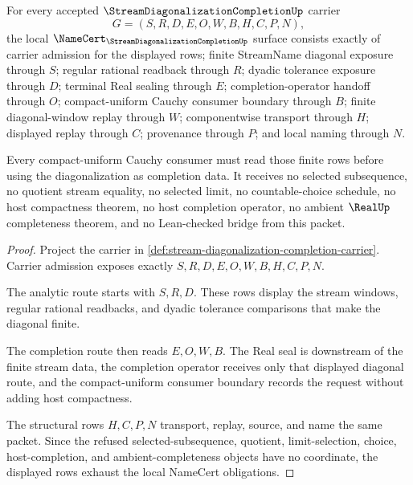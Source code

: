 \begin{theorem}
\label{thm:stream-diagonalization-completion-namecert-obligations}
For every accepted $\StreamDiagonalizationCompletionUp$ carrier
$$
G=(S,R,D,E,O,W,B,H,C,P,N),
$$
the local $\NameCert_{\StreamDiagonalizationCompletionUp}$ surface consists exactly of carrier admission for the displayed rows; finite StreamName diagonal exposure through $S$; regular rational readback through $R$; dyadic tolerance exposure through $D$; terminal Real sealing through $E$; completion-operator handoff through $O$; compact-uniform Cauchy consumer boundary through $B$; finite diagonal-window replay through $W$; componentwise transport through $H$; displayed replay through $C$; provenance through $P$; and local naming through $N$.

Every compact-uniform Cauchy consumer must read those finite rows before using the diagonalization as completion data. It receives no selected subsequence, no quotient stream equality, no selected limit, no countable-choice schedule, no host compactness theorem, no host completion operator, no ambient $\RealUp$ completeness theorem, and no Lean-checked bridge from this packet.
\end{theorem}
\begin{proof}
Project the carrier in \autoref{def:stream-diagonalization-completion-carrier}. Carrier admission exposes exactly $S,R,D,E,O,W,B,H,C,P,N$.

The analytic route starts with $S,R,D$. These rows display the stream windows, regular rational readbacks, and dyadic tolerance comparisons that make the diagonal finite.

The completion route then reads $E,O,W,B$. The Real seal is downstream of the finite stream data, the completion operator receives only that displayed diagonal route, and the compact-uniform consumer boundary records the request without adding host compactness.

The structural rows $H,C,P,N$ transport, replay, source, and name the same packet. Since the refused selected-subsequence, quotient, limit-selection, choice, host-completion, and ambient-completeness objects have no coordinate, the displayed rows exhaust the local NameCert obligations.
\end{proof}


